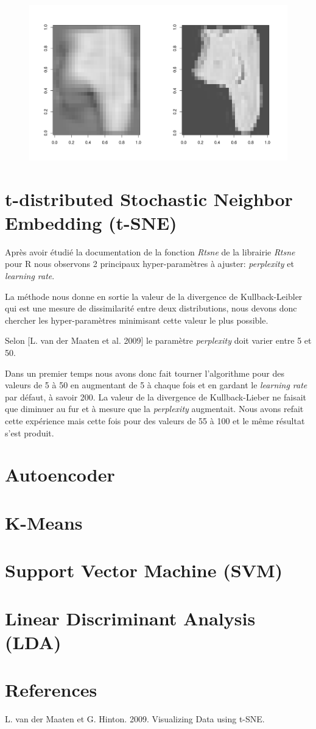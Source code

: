 \documentclass{article}
\begin{document}
\begin{figure}[H] 
\centering
\includegraphics[width=\textwidth, trim=0 0 0 5cm]{pca_reconst_9.png}
\label{fig:pca_ellipse}
\end{figure}

\section{t-distributed Stochastic Neighbor Embedding (t-SNE)}

Après avoir étudié la documentation de la fonction \textit{Rtsne} de la librairie \textit{Rtsne} pour R nous observons 2 principaux hyper-paramètres à ajuster: \textit{perplexity} et \textit{learning rate}. 

La méthode nous donne en sortie la valeur de la divergence de Kullback-Leibler qui est une mesure de dissimilarité entre deux distributions, nous devons donc chercher les hyper-paramètres minimisant cette valeur le plus possible.

Selon [L. van der Maaten et al. 2009] le paramètre \textit{perplexity} doit varier entre 5 et 50.  

Dans un premier temps nous avons donc fait tourner l'algorithme pour des valeurs de 5 à 50 en augmentant de 5 à chaque fois et en gardant le \textit{learning rate} par défaut, à savoir 200. La valeur de la divergence de Kullback-Lieber ne faisait que diminuer au fur et à mesure que la \textit{perplexity} augmentait. Nous avons refait cette expérience mais cette fois pour des valeurs de 55 à 100 et le même résultat s'est produit.

\section{Autoencoder}

\section{K-Means}

\section{Support Vector Machine (SVM)}

\section{Linear Discriminant Analysis (LDA)}

\section*{References}

L. van der Maaten et G. Hinton. 2009. Visualizing Data using t-SNE.
\end{document}
